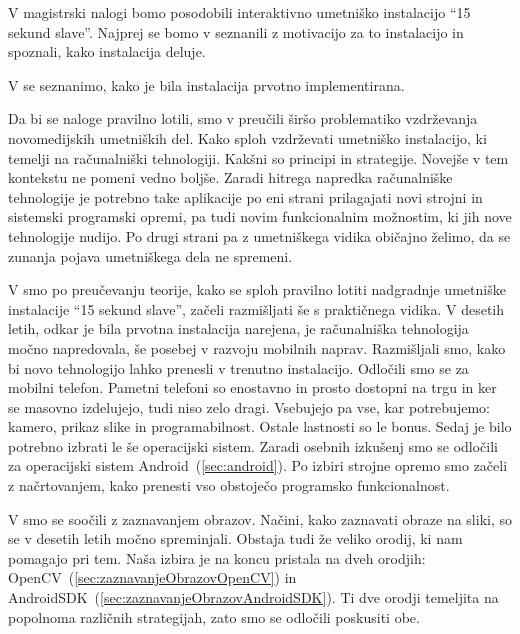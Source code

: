 \documentclass[a4paper, 12pt]{book}
\begin{document}
V magistrski nalogi bomo posodobili interaktivno umetniško instalacijo ``15
sekund slave''. Najprej se bomo v  seznanili
z motivacijo za to instalacijo in spoznali, kako instalacija deluje.

V  se seznanimo, kako je bila instalacija
prvotno implementirana.

Da bi se naloge pravilno lotili, smo v
 preučili širšo problematiko
vzdrževanja novomedijskih umetniških del. Kako sploh vzdrževati umetniško
instalacijo, ki temelji na računalniški tehnologiji. Kakšni so principi in
strategije. Novejše v tem kontekstu ne pomeni vedno boljše. Zaradi hitrega
napredka računalniške tehnologije je potrebno take aplikacije po eni strani
prilagajati novi strojni in sistemski programski opremi, pa tudi novim
funkcionalnim možnostim, ki jih nove tehnologije nudijo. Po drugi strani pa z
umetniškega vidika običajno želimo, da se zunanja pojava umetniškega dela ne
spremeni.

V  smo po preučevanju teorije,
kako se sploh pravilno lotiti nadgradnje umetniške instalacije ``15 sekund
slave'', začeli razmišljati še s praktičnega vidika. V desetih letih, odkar
je bila prvotna instalacija narejena, je računalniška tehnologija močno
napredovala, še posebej v razvoju mobilnih naprav. Razmišljali smo, kako bi
novo tehnologijo lahko prenesli v trenutno instalacijo. Odločili smo se za
mobilni telefon. Pametni telefoni so enostavno in prosto dostopni na trgu in
ker se masovno izdelujejo, tudi niso zelo dragi. Vsebujejo pa vse, kar
potrebujemo: kamero, prikaz slike in programabilnost. Ostale lastnosti so le
bonus. Sedaj je bilo potrebno izbrati le še operacijski sistem. Zaradi osebnih
izkušenj smo se odločili za operacijski sistem Android~(\ref{sec:android}). Po
izbiri strojne opremo smo začeli z načrtovanjem, kako prenesti vso obstoječo
programsko funkcionalnost.

V  smo se soočili z zaznavanjem obrazov.
Načini, kako zaznavati obraze na sliki, so se v desetih letih močno
spreminjali. Obstaja tudi že veliko orodij, ki nam pomagajo pri tem. Naša
izbira je na koncu pristala na dveh orodjih:
OpenCV~(\ref{sec:zaznavanjeObrazovOpenCV}) in
AndroidSDK~(\ref{sec:zaznavanjeObrazovAndroidSDK}). Ti dve orodji temeljita na
popolnoma različnih strategijah, zato smo se odločili poskusiti obe.
\end{document}

